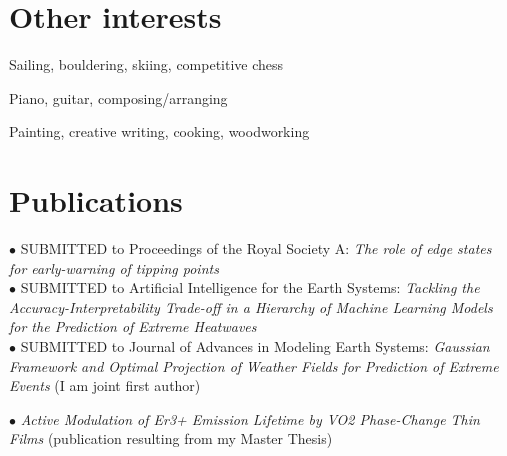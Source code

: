 \documentclass[11pt, a4 paper]{article}
\newcommand{\bu}{$\bullet$ }
\begin{document}
\section*{Other interests}
  \begin{description}[style=multiline,leftmargin=3cm,align=right]
    \item[Sports] Sailing, bouldering, skiing, competitive chess
    \item[Music] Piano, guitar, composing/arranging
    \item[Other] Painting, creative writing, cooking, woodworking
  \end{description}

\section*{Publications}
  \begin{description}[style=multiline,leftmargin=3cm,align=right]
    \item[2024]
    \bu SUBMITTED to Proceedings of the Royal Society A: \emph{The role of edge states for early-warning of tipping points} \cite{lohmannRoleEdgeStates2024} \\
    \bu SUBMITTED to Artificial Intelligence for the Earth Systems: \emph{Tackling the Accuracy-Interpretability Trade-off in a Hierarchy of Machine Learning Models for the Prediction of Extreme Heatwaves} \cite{lovoTacklingAccuracyInterpretabilityTradeHierarchy2024} \\
    \bu SUBMITTED to Journal of Advances in Modeling Earth Systems: \emph{Gaussian Framework and Optimal Projection of Weather Fields for Prediction of Extreme Events} \cite{mascoloGaussianFrameworkOptimal2024} (I am joint first author)
    \item[2023]
    \bu \emph{Active Modulation of Er3+ Emission Lifetime by VO2 Phase-Change Thin Films} \cite{kalinicActiveModulationEr32024} (publication resulting from my Master Thesis)
  \end{description}
\end{document}
